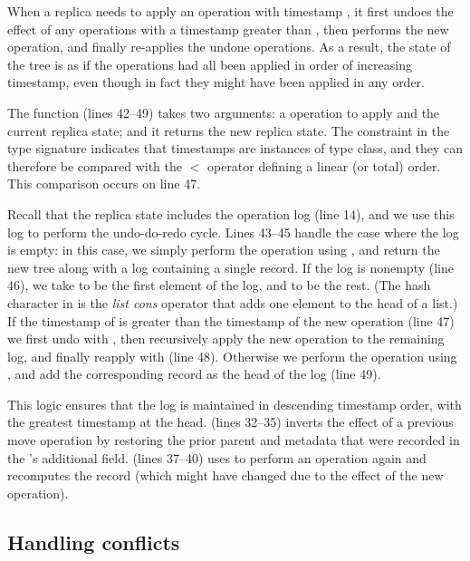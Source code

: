 \documentclass[10pt,journal,compsoc]{IEEEtran}
\begin{document}
When a replica needs to apply an operation with timestamp , it first undoes the effect of any operations with a timestamp greater than , then performs the new operation, and finally re-applies the undone operations.
As a result, the state of the tree is as if the operations had all been applied in order of increasing timestamp, even though in fact they might have been applied in any order.

The  function (lines 42--49) takes two arguments: a  operation to apply and the current replica state; and it returns the new replica state.
The constraint  in the type signature indicates that timestamps  are instances of  type class, and they can therefore be compared with the $<$ operator defining a linear (or total) order.
This comparison occurs on line 47.

Recall that the replica state includes the operation log (line 14), and we use this log to perform the undo-do-redo cycle.
Lines 43--45 handle the case where the log is empty: in this case, we simply perform the operation using , and return the new tree along with a log containing a single  record.
If the log is nonempty (line 46), we take  to be the first element of the log, and  to be the rest.
(The hash character in  is the \emph{list cons} operator that adds one element to the head of a list.)
If the timestamp of  is greater than the timestamp of the new operation (line 47) we first undo  with , then recursively apply the new operation to the remaining log, and finally reapply  with  (line 48).
Otherwise we perform the operation using , and add the corresponding  record as the head of the log (line 49).

This logic ensures that the log is maintained in descending timestamp order, with the greatest timestamp at the head.
 (lines 32--35) inverts the effect of a previous move operation by restoring the prior parent and metadata that were recorded in the 's additional field.
 (lines 37--40) uses  to perform an operation again and recomputes the  record (which might have changed due to the effect of the new operation).

\subsection{Handling conflicts}\label{sec:conflicts}
\end{document}
